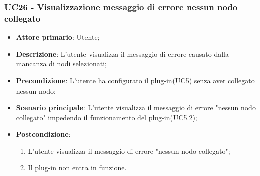 \subsubsection{UC26 - Visualizzazione messaggio di errore nessun nodo collegato}
\label{sssec:uc26}
\begin{itemize}
  \item \textbf{Attore primario}: Utente;
  \item \textbf{Descrizione}: L'utente visualizza il messaggio di errore causato dalla mancanza di nodi selezionati;
  \item \textbf{Precondizione}: L'utente ha configurato il plug-in(UC5) senza aver collegato nessun nodo;
  \item \textbf{Scenario principale}: L'utente visualizza il messaggio di errore "nessun nodo collegato" impedendo il funzionamento del plug-in(UC5.2);
  \item \textbf{Postcondizione}:
  \begin{enumerate}
		\item L'utente visualizza il messaggio di errore "nessun nodo collegato";
		\item Il plug-in non entra in funzione.
	\end{enumerate}
\end{itemize}

